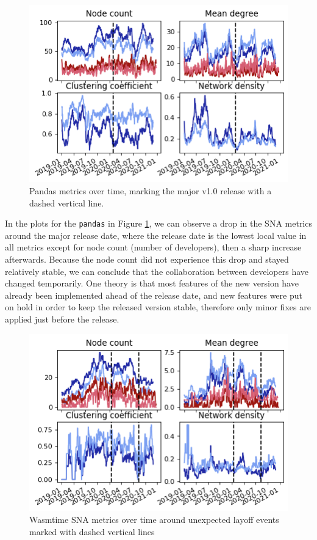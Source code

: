 \begin{figure}[h!]
    \centering
    \includegraphics{figures/pandas.png}
    \caption{Pandas metrics over time, marking the major v1.0 release with a dashed vertical line.}
    \label{fig:pandas}
\end{figure}

In the plots for the \texttt{pandas} in Figure \ref{fig:pandas}, we can observe a drop in the SNA metrics around the major release date, where the release date is the lowest local value in all metrics except for node count (number of developers), then a sharp increase afterwards. Because the node count did not experience this drop and stayed relatively stable, we can conclude that the collaboration between developers have changed temporarily. One theory is that most features of the new version have already been implemented ahead of the release date, and new features were put on hold in order to keep the released version stable, therefore only minor fixes are applied just before the release. \\

\begin{figure}[h!]
    \centering
    \includegraphics{figures/wasmtime.png}
    \caption{Wasmtime SNA metrics over time around unexpected layoff events marked with dashed vertical lines}
    \label{fig:wasmtime}
\end{figure}

